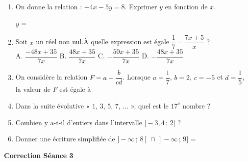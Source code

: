 \documentclass[a4paper,11pt]{article}
\begin{document}
\vspace*{2cm}
\begin{seanceD}{} %

\begin{enumerate}
\item On donne la relation : $-4x-5y=8$. Exprimer $y$ en fonction de $x$.

$y$ = \dotfill



\item Soit $x$ un réel non nul.À quelle expression est égale $\dfrac{1}{7}-\dfrac{7x+5}{x}$ ?\\ 
    
    	A. $\dfrac{-48x +35}{7x}$ \qquad B. $\dfrac{48x +35}{7x}$ \qquad C. $-\dfrac{50x +35}{7x}$ \qquad D. $-\dfrac{48x +35}{7x}$\qquad  
 \dotfill



\item On considère la relation $F=a+\dfrac{b}{cd}$. Lorsque $a=\dfrac{1}{7}$, $b=2$, $c=-5$ et $d=\dfrac{1}{5}$, la valeur de $F$ est égale à \dotfill



\item Dans la suite évolutive « $1$, $3$, $5$, $7$, $\ldots$ », quel est le $17^{\text{e}}$ nombre ?

\dotfill

\item Combien y a-t-il d'entiers dans l'intervalle $\bigg[-3{,}4  \, ; \, 2\bigg]$ ?

\dotfill

\item Donner une écriture simplifiée de $]-\infty\,;\, 8[\,\cap \,]-\infty\,;\,9]$ = \dotfill
\end{enumerate}

\end{seanceD} %
\vspace{0.5cm}
\begin{center}

\textbf{\textcolor{Couleur8}{Correction Séance 3}}\\
\vspace{2mm}

\end{center}
\newpage
\vspace*{1cm}
\end{document}
